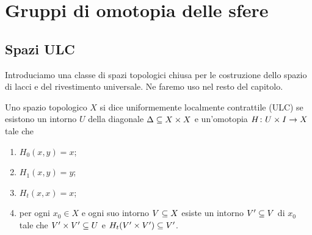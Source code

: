 \chapter{Gruppi di omotopia delle sfere}

\section{Spazi ULC}

Introduciamo una classe di spazi topologici chiusa per le costruzione dello spazio di lacci e del rivestimento universale. Ne faremo uso nel resto del capitolo.

\begin{definition}
Uno spazio topologico $X$ si dice uniformemente localmente contrattile (ULC) se esistono un intorno $U$ della diagonale $\Delta\subseteq X\times X$ e un'omotopia $H\colon U\times I\to X$ tale che
\begin{enumerate}
\item\label{ULC:pr1} $H_0(x,y)=x$;
\item\label{ULC:pr2} $H_1(x,y)=y$;
\item\label{ULC:pr3} $H_t(x,x)=x$;
\item\label{ULC:pr4} per ogni $x_0\in X$ e ogni suo intorno $V\subseteq X$ esiste un intorno $V'\subseteq V$ di $x_0$ tale che $V'\times V'\subseteq U$ e $H_t(V'\times V')\subseteq V'$.
\end{enumerate}
\end{definition}

